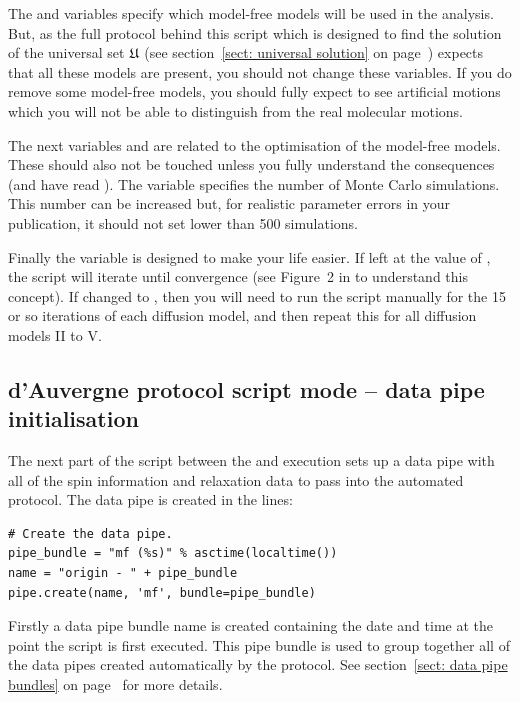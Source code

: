 \begin{htmlonly}
\begin{htmlonly}
The  and   variables specify which model-free models will be used in the analysis.
But, as the full protocol behind this script which is designed to find the solution of the universal set $\mathfrak{U}$ (see section~\ref{sect: universal solution} on page~\pageref{sect: universal solution}) expects that all these models are present, you should not change these variables.
If you do remove some model-free models, you should fully expect to see artificial motions which you will not be able to distinguish from the real molecular motions.

The next variables  and  are related to the optimisation of the model-free models.
These should also not be touched unless you fully understand the consequences (and have read \citet{dAuvergneGooley08a}).
The variable  specifies the number of Monte Carlo simulations.
This number can be increased but, for realistic parameter errors in your publication, it should not set lower than 500 simulations.

Finally the  variable is designed to make your life easier.
If left at the value of , the script will iterate until convergence (see Figure~2 in \citet{dAuvergneGooley08b} to understand this concept).
If changed to , then you will need to run the script manually for the 15 or so iterations of each diffusion model, and then repeat this for all diffusion models II to V.



\subsection{d'Auvergne protocol script mode -- data pipe initialisation}

The next part of the script between the  and execution sets up a data pipe with all of the spin information and relaxation data to pass into the automated protocol.
The data pipe is created in the lines:

\begin{lstlisting}[firstnumber=156]
# Create the data pipe.
pipe_bundle = "mf (%s)" % asctime(localtime())
name = "origin - " + pipe_bundle
pipe.create(name, 'mf', bundle=pipe_bundle)
\end{lstlisting}

Firstly a data pipe bundle name is created containing the date and time at the point the script is first executed.
This pipe bundle is used to group together all of the data pipes created automatically by the protocol.
See section~\ref{sect: data pipe bundles} on page~\pageref{sect: data pipe bundles} for more details.


\end{htmlonly}
\end{htmlonly}
